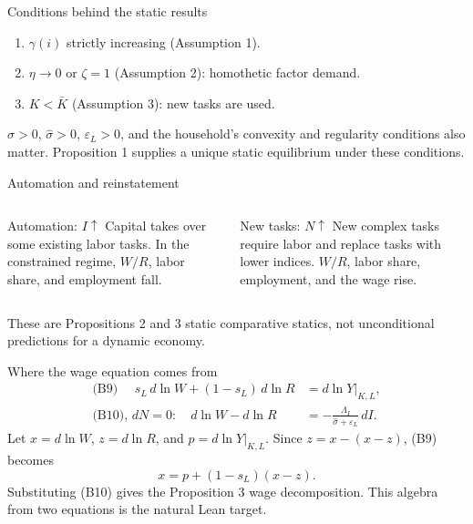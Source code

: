 \documentclass[aspectratio=169,11pt]{beamer}
\begin{document}
\begin{frame}{Conditions behind the static results}
\begin{enumerate}
\item $\gamma(i)$ strictly increasing (Assumption 1).
\item $\eta\to0$ or $\zeta=1$ (Assumption 2): homothetic factor demand.
\item $K<\bar K$ (Assumption 3): new tasks are used.
\end{enumerate}
\vspace{.6em}
$\sigma>0$, $\widehat\sigma>0$, $\varepsilon_L>0$, and the household's convexity and regularity conditions also matter. Proposition 1 supplies a unique static equilibrium under these conditions.
\end{frame}

\begin{frame}{Automation and reinstatement}
\begin{columns}[T]
\begin{block}{Automation: $I\uparrow$}
Capital takes over some existing labor tasks. In the constrained regime, $W/R$, labor share, and employment fall.
\end{block}
\begin{block}{New tasks: $N\uparrow$}
New complex tasks require labor and replace tasks with lower indices. $W/R$, labor share, employment, and the wage rise.
\end{block}
\end{columns}
\vspace{.7em}
These are Propositions 2 and 3 static comparative statics, not unconditional predictions for a dynamic economy.
\end{frame}

\begin{frame}{Where the wage equation comes from}
\begin{align*}
\text{(B9) }\quad s_L\,d\ln W+(1-s_L)\,d\ln R
  &=d\ln Y|_{K,L},\\
\text{(B10), }dN=0:\quad d\ln W-d\ln R
  &=-\frac{\Lambda_I}{\widehat\sigma+\varepsilon_L}\,dI.
\end{align*}
\vspace{.4em}
Let $x=d\ln W$, $z=d\ln R$, and $p=d\ln Y|_{K,L}$. Since $z=x-(x-z)$, (B9) becomes
\[x=p+(1-s_L)(x-z).\]
Substituting (B10) gives the Proposition 3 wage decomposition. This algebra from two equations is the natural Lean target.
\end{frame}
\end{document}
